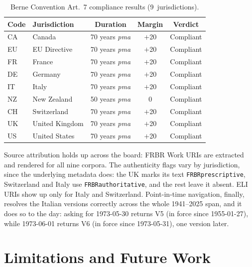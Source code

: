 \documentclass[12pt,a4paper]{article}
\begin{document}
\begin{table}[H]
\centering
\caption{Berne Convention Art.~7 compliance results (9~jurisdictions).}
\label{tab:compliance}
\begin{tabularx}{\textwidth}{lXccc}
\toprule
\textbf{Code} & \textbf{Jurisdiction} &
\textbf{Duration} & \textbf{Margin} & \textbf{Verdict} \\
\midrule
CA & Canada           & 70 years \emph{pma} & $+$20 & \textcolor{green!60!black}{Compliant} \\
EU & EU Directive     & 70 years \emph{pma} & $+$20 & \textcolor{green!60!black}{Compliant} \\
FR & France           & 70 years \emph{pma} & $+$20 & \textcolor{green!60!black}{Compliant} \\
DE & Germany          & 70 years \emph{pma} & $+$20 & \textcolor{green!60!black}{Compliant} \\
IT & Italy            & 70 years \emph{pma} & $+$20 & \textcolor{green!60!black}{Compliant} \\
NZ & New Zealand      & 50 years \emph{pma} & $0$    & \textcolor{green!60!black}{Compliant} \\
CH & Switzerland      & 70 years \emph{pma} & $+$20 & \textcolor{green!60!black}{Compliant} \\
UK & United Kingdom   & 70 years \emph{pma} & $+$20 & \textcolor{green!60!black}{Compliant} \\
US & United States    & 70 years \emph{pma} & $+$20 & \textcolor{green!60!black}{Compliant} \\
\bottomrule
\end{tabularx}
\end{table}

Source attribution holds up across the board: FRBR Work URIs are extracted
and rendered for all nine corpora. The authenticity flags vary by
jurisdiction, since the underlying metadata does: the UK marks its text
\texttt{FRBRprescriptive}, Switzerland and Italy use
\texttt{FRBRauthoritative}, and the rest leave it absent. ELI URIs show up
only for Italy and Switzerland. Point-in-time navigation, finally, resolves
the Italian versions correctly across the whole 1941--2025 span, and it does
so to the day: asking for 1973-05-30 returns V5 (in force since 1955-01-27),
while 1973-06-01 returns V6 (in force since 1973-05-31), one version later.

\section{Limitations and Future Work}
\end{document}
